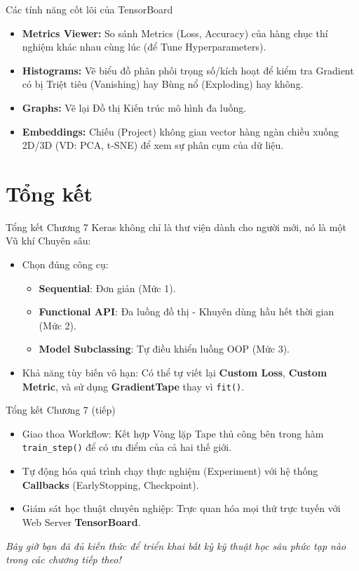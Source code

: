 \documentclass[aspectratio=169]{beamer}
\begin{document}
\begin{frame}{Các tính năng cốt lõi của TensorBoard}
    \begin{itemize}
        \item \textbf{Metrics Viewer:} So sánh Metrics (Loss, Accuracy) của hàng chục thí nghiệm khác nhau cùng lúc (để Tune Hyperparameters).
        \item \textbf{Histograms:} Vẽ biểu đồ phân phối trọng số/kích hoạt để kiểm tra Gradient có bị Triệt tiêu (Vanishing) hay Bùng nổ (Exploding) hay không.
        \item \textbf{Graphs:} Vẽ lại Đồ thị Kiến trúc mô hình đa luồng.
        \item \textbf{Embeddings:} Chiếu (Project) không gian vector hàng ngàn chiều xuống 2D/3D (VD: PCA, t-SNE) để xem sự phân cụm của dữ liệu.
    \end{itemize}
\end{frame}

\section{Tổng kết}

\begin{frame}{Tổng kết Chương 7}
    Keras không chỉ là thư viện dành cho người mới, nó là một Vũ khí Chuyên sâu:
    \begin{itemize}
        \item Chọn đúng công cụ: 
        \begin{itemize}
            \item \textbf{Sequential}: Đơn giản (Mức 1).
            \item \textbf{Functional API}: Đa luồng đồ thị - Khuyên dùng hầu hết thời gian (Mức 2).
            \item \textbf{Model Subclassing}: Tự điều khiển luồng OOP (Mức 3).
        \end{itemize}
        \item Khả năng tùy biến vô hạn: Có thể tự viết lại \textbf{Custom Loss}, \textbf{Custom Metric}, và sử dụng \textbf{GradientTape} thay vì \texttt{fit()}.
    \end{itemize}
\end{frame}

\begin{frame}{Tổng kết Chương 7 (tiếp)}
    \begin{itemize}
        \item Giao thoa Workflow: Kết hợp Vòng lặp Tape thủ công bên trong hàm \texttt{train\_step()} để có ưu điểm của cả hai thế giới.
        \item Tự động hóa quá trình chạy thực nghiệm (Experiment) với hệ thống \textbf{Callbacks} (EarlyStopping, Checkpoint).
        \item Giám sát học thuật chuyên nghiệp: Trực quan hóa mọi thứ trực tuyến với Web Server \textbf{TensorBoard}.
    \end{itemize}
    \vspace{0.5cm}
    \textit{Bây giờ bạn đã đủ kiến thức để triển khai bất kỳ kỹ thuật học sâu phức tạp nào trong các chương tiếp theo!}
\end{frame}
\end{document}
